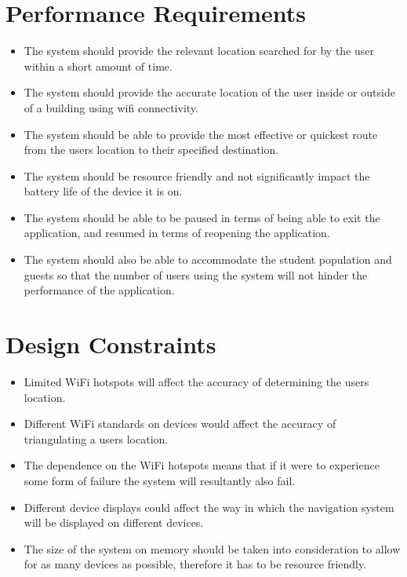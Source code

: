 \documentclass{article}
\begin{document}
	\section{Performance Requirements}\label{sec:performance-requirements}
		\begin{itemize}
		\small
		\item The system should provide the relevant location searched for by the user within a short amount of time.
		\item The system should provide the accurate location of the user inside or outside of a building using wifi connectivity.
		\item The system should be able to provide the most effective or quickest route from the users location to their specified destination.
		\item The system should be resource friendly and not significantly impact the battery life of the device it is on.
		\item The system should be able to be paused in terms of being able to exit the application, and resumed in terms of reopening the application.
		\item The system should also be able to accommodate the student population and guests so that the number of users using the system will not hinder the performance of the application.
		\end{itemize}
		
		
	\clearpage

	\section{Design Constraints}\label{sec:design-constraints}
		\begin{itemize}
		\small
		\item Limited WiFi hotspots will affect the accuracy of determining the users location.
		\item Different WiFi standards on devices would affect the accuracy of triangulating a users location.
		\item The dependence on the WiFi hotspots means that if it were to experience some form of failure the system will resultantly also fail.
		\item Different device displays could affect the way in which the navigation system will be displayed on different devices.
		\item The size of the system on memory should be taken into consideration to allow for as many devices as possible, therefore it has to be resource friendly.
		\end{itemize}
		
\end{document}
